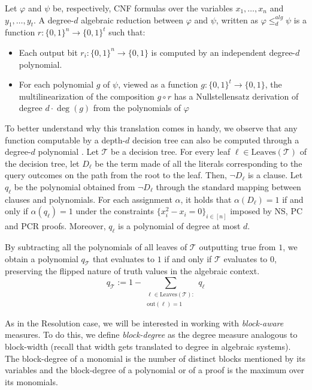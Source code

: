 \begin{definition}
    Let $\varphi$ and $\psi$ be, respectively, CNF formulas over the variables $x_1, \ldots, x_n$ and $y_1, \ldots, y_t$. A degree-$d$ algebraic reduction between $\varphi$ and $\psi$, written as $\varphi \leq_{d}^{alg} \psi$ is a function $r : \{0,1\}^n \to \{0,1\}^t$ such that:
    \begin{itemize}
        \item Each output bit $r_i : \{0,1\}^n \to \{0,1\}$ is computed by an independent degree-$d$ polynomial.
        \item For each polynomial $g$ of $\psi$, viewed as a function $g : \{0,1\}^t \to \{0,1\}$, the multilinearization of the composition $g \circ r$ has a Nullstellensatz derivation of degree $d \cdot \deg(g)$ from the polynomials of $\varphi$
    \end{itemize}
\end{definition}

To better understand why this translation comes in handy, we observe that any function computable by a depth-$d$ decision tree can also be computed through a degree-$d$ polynomial \cite{jukna,alg_nphard}. Let $\mathcal{T}$ be a decision tree. For every leaf $\ell \in \mathrm{Leaves}(\mathcal{T})$ of the decision tree, let $D_\ell$ be the term made of all the literals corresponding to the query outcomes on the path from the root to the leaf. Then, $\lnot D_\ell$ is a clause. Let $q_\ell$ be the polynomial obtained from $\lnot D_{\ell}$ through the standard mapping between clauses and polynomials. For each assignment $\alpha$, it holds that $\alpha(D_\ell) = 1$ if and only if $\alpha(q_\ell) = 1$ under the constraints $\{x_i^2-x_i = 0\}_{i \in [n]}$ imposed by NS, PC and PCR proofs. Moreover, $q_\ell$ is a polynomial of degree at most $d$.

By subtracting all the polynomials of all leaves of $\mathcal{T}$ outputting true from $1$, we obtain a polynomial $q_{\mathcal{T}}$ that evaluates to $1$ if and only if $\mathcal{T}$ evaluates to 0, preserving the flipped nature of truth values in the algebraic context.
\begin{equation}
    q_{\mathcal{T}} := 1- \sum_{\substack{\ell \in \mathrm{Leaves}(\mathcal{T}):\\ \mathrm{out}(\ell) = 1}} q_\ell
\end{equation}

As in the Resolution case, we will be interested in working with \textit{block-aware} measures. To do this, we define \textit{block-degree} as the degree measure analogous to block-width (recall that width gets translated to degree in algebraic systems). The block-degree of a monomial is the number of distinct blocks mentioned by its variables and the block-degree of a polynomial or of a proof is the maximum over its monomials.

